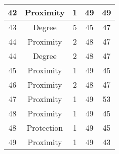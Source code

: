 \documentclass[results.tex]{subfiles}
\begin{document}
\begin{center}
\begin{tabular}{| c || c | c | c | c |}
    \hline
    42 & Proximity & 1 & 49 & 49 \\ 
    \hline
    43 & Degree & 5 & 45 & 47 \\ 
    \hline
    44 & Proximity & 2 & 48 & 47 \\ 
    \hline
    44 & Degree & 2 & 48 & 47 \\ 
    \hline
    45 & Proximity & 1 & 49 & 45 \\ 
    \hline
    46 & Proximity & 2 & 48 & 47 \\ 
    \hline
    47 & Proximity & 1 & 49 & 53 \\ 
    \hline
    48 & Proximity & 1 & 49 & 45 \\ 
    \hline
    48 & Protection & 1 & 49 & 45 \\ 
    \hline
    49 & Proximity & 1 & 49 & 43 \\ 
    \hline   \end{tabular}
\end{center}
\end{document}
